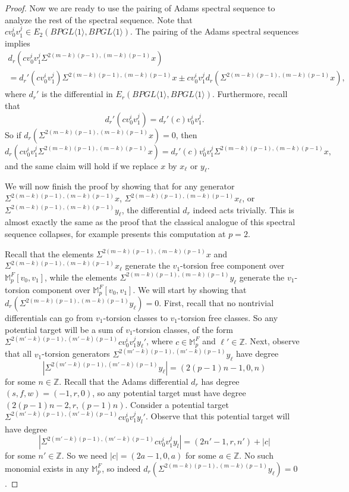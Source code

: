 \documentclass{amsart}
\theoremstyle{plain}
\numberwithin{theorem}{section}
\numberwithin{equation}{section}
\numberwithin{figure}{section}
\newcommand{\mM}{{\mathbb M}}
\newcommand{\0}{\langle 0 \rangle }
\begin{document}
\begin{proof}
Now we are ready to use the pairing of Adams spectral sequence to analyze the rest of the spectral sequence. Note that $cv_0^iv_1^j \in E_2(BPGL\langle 1 \rangle, BPGL\langle 1 \rangle)$. The pairing of the Adams spectral sequences implies 
\begin{align*}
d_r\left(cv_{0}^{i}v_{1}^{j}\Sigma^{2(m-k)(p-1), (m-k)(p-1)}x\right) \\
= d_r'\left(cv_0^{i}v_{1}^{j}\right)\Sigma^{2(m-k)(p-1), (m-k)(p-1)}x \pm cv_0^{i}v_{1}^{j}d_r\left(\Sigma^{2(m-k)(p-1), (m-k)(p-1)}x\right),
\end{align*} 
where $d_r'$ is the differential in $E_r(BPGL\langle 1 \rangle, BPGL \langle 1 \rangle)$. Furthermore, recall that 
\[
d_r'\left(cv_0^iv_1^j\right)  = d_r'\left(c\right)v_0^iv_1^j.
\]
So if $d_r\left(\Sigma^{2(m-k)(p-1), (m-k)(p-1)}x\right) = 0$, then
\[d_r\left(cv_{0}^{i}v_{1}^{j}\Sigma^{2(m-k)(p-1), (m-k)(p-1)}x\right) = d_r'\left(c\right)v_0^{i}v_{1}^{j}\Sigma^{2(m-k)(p-1), (m-k)(p-1)}x,\]
and the same claim will hold if we replace $x$ by $x_\ell$ or $y_\ell$.

We will now finish the proof by showing that for any generator $\Sigma^{2(m-k)(p-1), (m-k)(p-1)}x$, $\Sigma^{2(m-k)(p-1), (m-k)(p-1)}x_\ell$, or $\Sigma^{2(m-k)(p-1), (m-k)(p-1)}y_\ell$, the differential $d_r$ indeed acts trivially. This is almost exactly the same as the proof that the classical analogue of this spectral sequence collapses, for example \cite[Section~2]{LiPetTat25} presents this computation at $p=2$. 

Recall that the elements $\Sigma^{2(m-k)(p-1), (m-k)(p-1)}x$ and $\Sigma^{2(m-k)(p-1), (m-k)(p-1)}x_\ell$ generate the $v_1$-torsion free component over $\mM_p^F[v_0, v_1]$, while the elements $\Sigma^{2(m-k)(p-1), (m-k)(p-1)}y_\ell$ generate the $v_1$-torsion component over $\mM_p^F[v_0, v_1]$. We will start by showing that $d_r(\Sigma^{2(m-k)(p-1), (m-k)(p-1)}y_\ell) = 0$. First, recall that no nontrivial differentials can go from $v_{1}$-torsion classes to $v_{1}$-torsion free classes. So any potential target will be a sum of $v_1$-torsion classes, of the form $\Sigma^{2(m'-k)(p-1), (m'-k)(p-1)}cv_0^iv_1^jy_\ell'$, where $c \in \mM_p^F$ and $\ell' \in \mathbb{Z}$. Next, observe that all $v_{1}$-torsion generators $\Sigma^{2(m'-k)(p-1), (m'-k)(p-1)}y_\ell$ have degree 
\[|\Sigma^{2(m'-k)(p-1), (m'-k)(p-1)}y_\ell| = (2(p-1)n-1,0,n)\] 
for some $n \in \mathbb{Z}.$ Recall that the Adams differential $d_{r}$ has degree $(s,f,w) = (-1,r,0)$, so any potential target must have degree $(2(p-1)n-2, r, (p-1)n)$. Consider a potential target $\Sigma^{2(m'-k)(p-1), (m'-k)(p-1)}cv_0^iv_1^jy_l'$. Observe that this potential target will have degree 
\[|\Sigma^{2(m'-k)(p-1), (m'-k)(p-1)}cv_0^iv_1^jy_l| = (2n'-1, r, n') + |c|\] 
for some $n' \in \mathbb{Z}$. So we need $|c| = (2a-1,0,a)$ for some $a \in \mathbb{Z}$. No such monomial exists in any $\mathbb{M}_p^F$, so indeed $d_r(\Sigma^{2(m-k)(p-1), (m-k)(p-1)}y_\ell) = 0$.


\end{proof}
\end{document}
